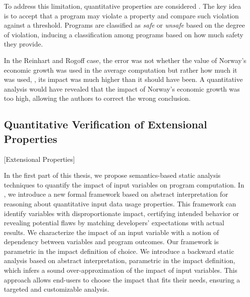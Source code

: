 To address this limitation, quantitative properties are considered .
The key idea is to accept that a program may violate a property and compare such violation against a threshold.
Programs are classified as \emph{safe} or \emph{unsafe} based on the degree of violation, inducing a classification among programs based on how much safety they provide.

In the Reinhart and Rogoff case,
the error was not whether
the value of Norway's economic growth
was used
in the average computation
but rather how much it was used, \ie,
its impact was much higher than it should have been.
A quantitative analysis would have revealed that the impact of Norway's economic growth was too high, allowing the authors to correct the wrong conclusion.

\subsection{Quantitative Verification of Extensional Properties}[Extensional Properties]


In the first part of this thesis, we propose semantics-based static analysis techniques to quantify the impact of input variables on program computation.
In , we introduce a new formal framework based on abstract interpretation for reasoning about quantitative input data usage properties.
This framework can identify variables with disproportionate impact, certifying intended behavior or revealing potential flaws by matching developers' expectations with actual results.
We characterize the impact of an input variable with a notion of dependency between variables and program outcomes.
Our framework is parametric in the impact definition of choice.
%
We introduce a backward static analysis based on abstract interpretation, parametric in the impact definition, which infers a sound over-approximation of the impact of input variables.
This approach allows end-users to choose the impact that fits their needs, ensuring a targeted and customizable analysis.


